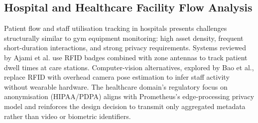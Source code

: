 \subsection{Hospital and Healthcare Facility Flow Analysis}
Patient flow and staff utilisation tracking in hospitals presents challenges structurally similar to gym equipment monitoring: high asset density, frequent short-duration interactions, and strong privacy requirements. Systems reviewed by Ajami et al. use RFID badges combined with zone antennas to track patient dwell times at care stations. Computer-vision alternatives, explored by Bao et al., replace RFID with overhead camera pose estimation to infer staff activity without wearable hardware. The healthcare domain's regulatory focus on anonymisation (HIPAA/PDPA) aligns with Prometheus's edge-processing privacy model and reinforces the design decision to transmit only aggregated metadata rather than video or biometric identifiers.
